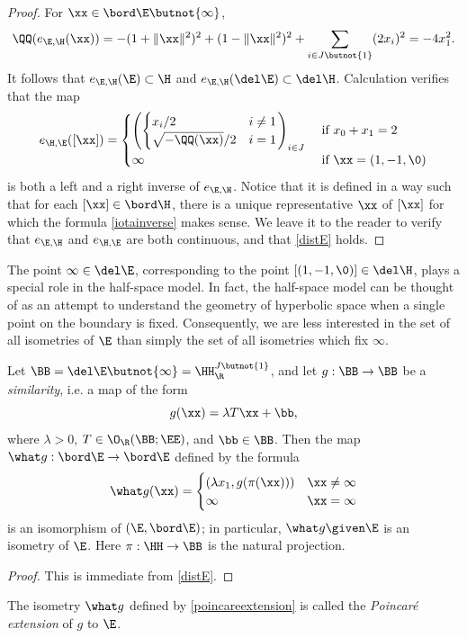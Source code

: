 \begin{proof}
For $\xx\in\bord\E\butnot\{\infty\}$,
\[
\QQ(e_{\E,\H}(\xx)) = -(1 + \|\xx\|^2)^2 + (1 - \|\xx\|^2)^2 + \sum_{i\in J\butnot\{1\}}(2x_i)^2 = -4x_1^2.
\]
It follows that $e_{\E,\H}(\E) \subset\H$ and $e_{\E,\H}(\del\E)\subset\del\H$. Calculation verifies that the map
\begin{equation}
\label{iotainverse}
e_{\H,\E}([\xx]) = \begin{cases}\left(\begin{cases}
x_i/2 & i\neq 1\\
\sqrt{-\QQ(\xx)}/2 & i = 1
\end{cases}\right)_{i\in J} &\text{ if }x_0 + x_1 = 2 \\
\infty &\text{ if } \xx = (1,-1,\0)
\end{cases}
\end{equation}
is both a left and a right inverse of $e_{\E,\H}$. Notice that it is defined in a way such that for each $[\xx]\in\bord\H$, there is a unique representative $\xx$ of $[\xx]$ for which the formula \eqref{iotainverse} makes sense. We leave it to the reader to verify that $e_{\E,\H}$ and $e_{\H,\E}$ are both continuous, and that \eqref{distE} holds.
\end{proof}

The point $\infty\in\del\E$, corresponding to the point $[(1,-1,\0)]\in\del\H$, plays a special role in the half-space model. In fact, the half-space model can be thought of as an attempt to understand the geometry of hyperbolic space when a single point on the boundary is fixed. Consequently, we are less interested in the set of all isometries of $\E$ than simply the set of all isometries which fix $\infty$.

\begin{observation}
\label{observationpoincareextension}
Let $\BB = \del\E\butnot\{\infty\} = \HH_\R^{J\butnot\{1\}}$, and let $g:\BB\to\BB$ be a \emph{similarity}, i.e. a map of the form
\[
g(\xx) = \lambda T\xx + \bb,
\]
where $\lambda > 0$, $T\in\O_\R(\BB;\EE)$, and $\bb\in\BB$. Then the map $\what g:\bord\E\to\bord\E$ defined by the formula
\begin{equation}
\label{poincareextension}
\what g(\xx) = \begin{cases}
(\lambda x_1,g(\pi(\xx))) & \xx\neq \infty \\
\infty & \xx = \infty
\end{cases}
\end{equation}
is an isomorphism of $(\E,\bord\E)$; in particular, $\what g\given\E$ is an isometry of $\E$. Here $\pi:\HH\to\BB$ is the natural projection.
\end{observation}
\begin{proof}
This is immediate from \eqref{distE}.
\end{proof}
The isometry $\what g$ defined by \eqref{poincareextension} is called the \emph{Poincar\'e extension} of $g$ to $\E$.

